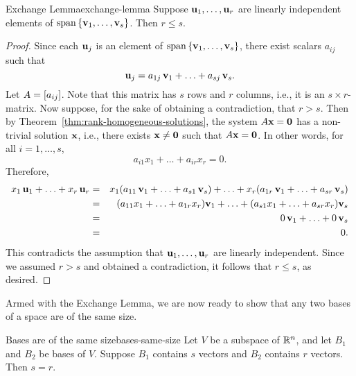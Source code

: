 \begin{lemma}{Exchange Lemma}{exchange-lemma}
  Suppose $\mbox{\bf u}_{1},\ldots,\mbox{\bf u}_{r}$ are linearly independent
  elements of $\sspan\set{\vect{v}_{1},\ldots,\vect{v}_{s}}$. Then
  $r\leq s$.
\end{lemma}

\begin{proof}
  Since each $\mbox{\bf u}_j$ is an element of
  $\sspan\set{\vect{v}_{1},\ldots,\vect{v}_{s}}$, there exist
  scalars $a_{ij}$ such that
  \begin{equation*}
    \mbox{\bf u}_{j} = a_{1j}\,\mbox{\bf v}_1 + \ldots + a_{sj}\,\mbox{\bf v}_s.
  \end{equation*}
  Let $A = \left[a_{ij}\right]$. Note that this matrix has $s$ rows and $r$
  columns, i.e., it is an $s\times r$-matrix. Now suppose, for the
  sake of obtaining a contradiction, that $r>s$. Then by
  Theorem~\ref{thm:rank-homogeneous-solutions}, the system
  $A\mbox{\bf x}=\mbox{\bf 0}$ has a non-trivial solution $\mbox{\bf x}$, i.e.,
  there exists $\mbox{\bf x}\neq\mbox{\bf 0}$ such that $A\mbox{\bf x}=\mbox{\bf 0}$.
  In other words, for all $i=1,\ldots,s$, 
  \begin{equation*}
    a_{i1}x_1 + \ldots + a_{ir}x_r = 0.
  \end{equation*}
  Therefore,
  \begin{eqnarray*}
    x_1\,\mbox{\bf u}_1 + \ldots + x_r\,\mbox{\bf u}_r
    &=&
        x_1(a_{11}\,\mbox{\bf v}_1 + \ldots + a_{s1}\,\mbox{\bf v}_s)
        + \ldots
        + x_r(a_{1r}\,\mbox{\bf v}_1 + \ldots + a_{sr}\,\mbox{\bf v}_s)
    \\
    &=&
        (a_{11}x_1 + \ldots + a_{1r}x_r)\mbox{\bf v}_1
        + \ldots
        + (a_{s1}x_1 + \ldots + a_{sr}x_r)\mbox{\bf v}_s
    \\
    &=& 0\,\mbox{\bf v}_1 + \ldots + 0\,\mbox{\bf v}_s
    \\
    &=& 0.
  \end{eqnarray*}
  This contradicts the assumption that
  $\mbox{\bf u}_{1},\ldots,\mbox{\bf u}_{r}$ are linearly independent. Since
  we assumed $r>s$ and obtained a contradiction, it follows that
  $r\leq s$, as desired.
\end{proof}

Armed with the Exchange Lemma, we are now ready to show that any two
bases of a space are of the same size.

\begin{theorem}{Bases are of the same size}{bases-same-size}
  Let $V$ be a subspace of\/ $\mathbb{R}^{n}$, and let $B_1$ and $B_2$ be
  bases of $V$. Suppose $B_1$ contains $s$ vectors and $B_2$ contains
  $r$ vectors. Then $s=r$.
\end{theorem}

